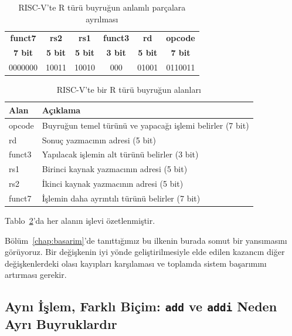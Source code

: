 \begin{table}[H]
\centering
\caption{RISC-V'te R türü buyruğun anlamlı parçalara ayrılması}
\label{tab:buyruk-parcalari}
\begin{tabular}{cccccc}
\toprule
\textbf{funct7} & \textbf{rs2} & \textbf{rs1} & \textbf{funct3} & \textbf{rd} & \textbf{opcode} \\
\textbf{7 bit} & \textbf{5 bit} & \textbf{5 bit} & \textbf{3 bit} & \textbf{5 bit} & \textbf{7 bit} \\
\midrule
0000000 & 10011 & 10010 & 000 & 01001 & 0110011 \\
\bottomrule
\end{tabular}
\end{table}

\begin{table}[H]
\centering
\caption{RISC-V'te bir R türü buyruğun alanları}
\label{tab:buyruk-alanlari}
\begin{tabular}{lp{10cm}}
\toprule
\textbf{Alan} & \textbf{Açıklama} \\
\midrule
opcode & Buyruğun temel türünü ve yapacağı işlemi belirler (7 bit) \\
rd     & Sonuç yazmacının adresi (5 bit) \\
funct3 & Yapılacak işlemin alt türünü belirler (3 bit) \\
rs1    & Birinci kaynak yazmacının adresi (5 bit) \\
rs2    & İkinci kaynak yazmacının adresi (5 bit) \\
funct7 & İşlemin daha ayrıntılı türünü belirler (7 bit) \\
\bottomrule
\end{tabular}
\end{table}

Tablo~\ref{tab:buyruk-alanlari}'da her alanın işlevi özetlenmiştir.

\begin{tanim}
Bölüm~\ref{chap:basarim}'de tanıttığımız bu ilkenin burada somut bir yansımasını görüyoruz. Bir değişkenin iyi yönde geliştirilmesiyle elde edilen kazancın diğer değişkenlerdeki olası kayıpları karşılaması ve toplamda sistem başarımını artırması gerekir.
\end{tanim}

\subsection{Aynı İşlem, Farklı Biçim: \texttt{add} ve \texttt{addi} Neden Ayrı Buyruklardır}

